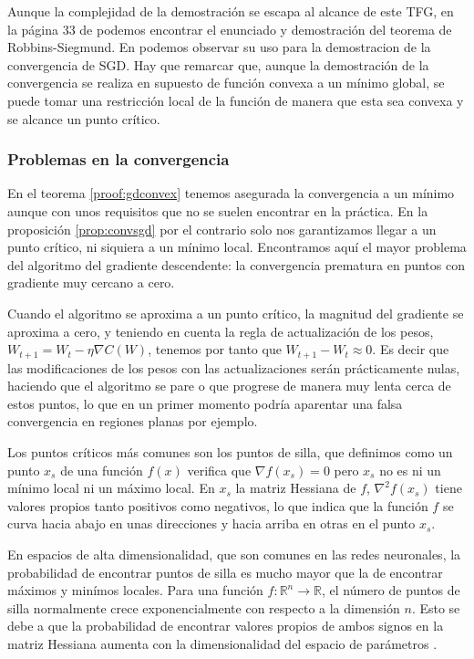 Aunque la complejidad de la demostración se escapa al alcance de este TFG, en la página 33 de \cite{RobbinSiegmund} podemos encontrar el enunciado y demostración del teorema de Robbins-Siegmund. En \cite{RobbinSiegmundtoSGD} podemos observar su uso para la demostracion de la convergencia de SGD. Hay que remarcar que, aunque la demostración de la convergencia se realiza en supuesto de función convexa a un mínimo global, se puede tomar una restricción local de la función de manera que esta sea convexa y se alcance un punto crítico.



\subsubsection{Problemas en la convergencia}


En el teorema \ref{proof:gdconvex} tenemos asegurada la convergencia a un mínimo aunque con unos requisitos que no se suelen encontrar en la práctica. En la proposición \ref{prop:convsgd} por el contrario solo nos garantizamos llegar a un punto crítico, ni siquiera a un mínimo local. Encontramos aquí el mayor problema del algoritmo del gradiente descendente: la convergencia prematura en puntos con gradiente muy cercano a cero. 

Cuando el algoritmo se aproxima a un punto crítico, la magnitud del gradiente se aproxima a cero, y teniendo en cuenta la regla de actualización de los pesos, $W_{t+1}=W_t - \eta \nabla C(W)$, tenemos por tanto que $W_{t+1} - W_t \approx 0$. Es decir que las modificaciones de los pesos con las actualizaciones serán prácticamente nulas, haciendo que el algoritmo se pare o que progrese de manera muy lenta cerca de estos puntos, lo que en un primer momento podría aparentar una falsa convergencia en regiones planas por ejemplo. 

Los puntos críticos más comunes son los puntos de silla, que definimos como un punto $x_s$ de una función $f(x)$ verifica que $\nabla f(x_s)=0$ pero $x_s$ no es ni un mínimo local ni un máximo local. En $x_s$ la matriz Hessiana de $f$, $\nabla^2 f(x_s)$ tiene valores propios tanto positivos como negativos, lo que indica que la función $f$ se curva hacia abajo en unas direcciones y hacia arriba en otras en el punto $x_s$.

En espacios de alta dimensionalidad, que son comunes en las redes neuronales, la probabilidad de encontrar puntos de silla es mucho mayor que la de encontrar máximos y minímos locales. Para una función $f:\mathbb{R}^n \rightarrow \mathbb{R}$, el número de puntos de silla normalmente crece exponencialmente con respecto a la dimensión $n$. Esto se debe a que la probabilidad de encontrar valores propios de ambos signos en la matriz Hessiana aumenta con la dimensionalidad del espacio de parámetros \cite{dauphin2014SaddlePoints}. 

